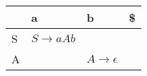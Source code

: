\documentclass{standalone}
\providecommand\lightrule{%
	\arrayrulecolor{black!30}%
	\midrule[\lightrulewidth]%
	\arrayrulecolor{black}}
\begin{document}
\begin{tabularx}{\textwidth}{XXXX}
     & a & b & \$ \\
    \midrule
        S
        &
        \(S \rightarrow aAb\)
        &
        
        &
        \\ \lightrule
        A
        &
        
        &
        \(A \rightarrow \epsilon\)
        &
\end{tabularx}
\end{document}
